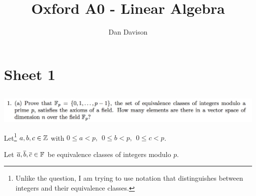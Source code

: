 \documentclass[12pt]{article}
\begin{document}
\title{Oxford A0 - Linear Algebra }
\author{Dan Davison}
\maketitle

\section*{Sheet 1}

\subsection*{} %
\begin{mdframed}
\includegraphics[width=450pt]{img/linear-algebra-a0-1-1-a.png}\\
\end{mdframed}

Let\footnote{Unlike the question, I am trying to use notation that
  distinguishes between integers and their equivalence classes.}
$a, b, c \in \mathbb{Z}$ with $0 \leq a < p, ~~ 0 \leq b < p, ~~ 0 \leq c < p$.

Let $\overline a, \overline b, \overline c \in \mathbb{F}$ be equivalence classes of integers modulo $p$.
\end{document}
